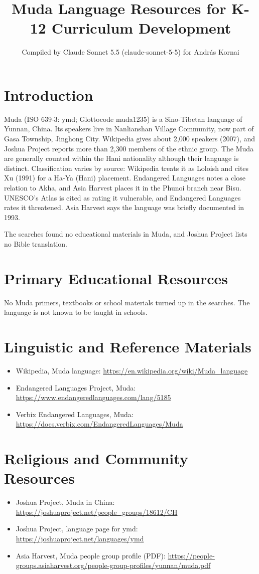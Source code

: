 \documentclass[12pt]{article}
\title{Muda Language Resources for K-12 Curriculum Development}
\author{Compiled by Claude Sonnet 5.5 (claude-sonnet-5-5) for Andr\'as Kornai}
\date{}
\begin{document}
\maketitle

\section{Introduction}
Muda (ISO 639-3: ymd; Glottocode muda1235) is a Sino-Tibetan language of Yunnan, China. Its speakers live in Nanlianshan Village Community, now part of Gasa Township, Jinghong City. Wikipedia gives about 2,000 speakers (2007), and Joshua Project reports more than 2,300 members of the ethnic group. The Muda are generally counted within the Hani nationality although their language is distinct. Classification varies by source: Wikipedia treats it as Loloish and cites Xu (1991) for a Ha-Ya (Hani) placement. Endangered Languages notes a close relation to Akha, and Asia Harvest places it in the Phunoi branch near Bisu. UNESCO's Atlas is cited as rating it vulnerable, and Endangered Languages rates it threatened. Asia Harvest says the language was briefly documented in 1993.

The searches found no educational materials in Muda, and Joshua Project lists no Bible translation.

\section{Primary Educational Resources}
No Muda primers, textbooks or school materials turned up in the searches. The language is not known to be taught in schools.

\section{Linguistic and Reference Materials}
\begin{itemize}
\item Wikipedia, Muda language: \url{https://en.wikipedia.org/wiki/Muda_language}
\item Endangered Languages Project, Muda: \url{https://www.endangeredlanguages.com/lang/5185}
\item Verbix Endangered Languages, Muda: \url{https://docs.verbix.com/EndangeredLanguages/Muda}
\end{itemize}

\section{Religious and Community Resources}
\begin{itemize}
\item Joshua Project, Muda in China: \url{https://joshuaproject.net/people_groups/18612/CH}
\item Joshua Project, language page for ymd: \url{https://joshuaproject.net/languages/ymd}
\item Asia Harvest, Muda people group profile (PDF): \url{https://people-groups.asiaharvest.org/people-group-profiles/yunnan/muda.pdf}
\end{itemize}
\end{document}
